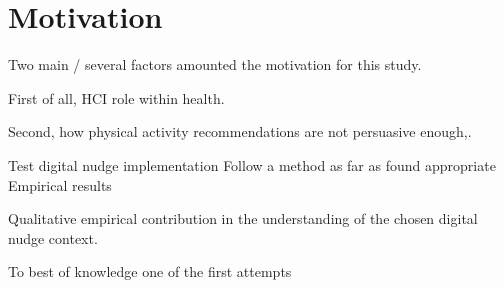 \chapter*{Motivation} 

Two main / several factors amounted the motivation for this study. 

First of all, HCI role within health. 

Second, how physical activity recommendations are not persuasive enough,. 

Test digital nudge implementation
Follow a method as far as found appropriate 
Empirical results 

Qualitative empirical contribution in the understanding of the chosen digital nudge context. 

To best of knowledge one of the first attempts 


